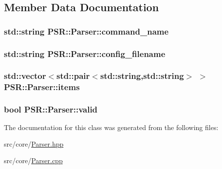 \subsection{\-Member \-Data \-Documentation}
\hypertarget{classPSR_1_1Parser_a1c3ab112c2c5c73d1df9f505b4bb4ecd}{
\subsubsection[{command\-\_\-name}]{\setlength{\rightskip}{0pt plus 5cm}std\-::string {\bf \-P\-S\-R\-::\-Parser\-::command\-\_\-name}}}\label{classPSR_1_1Parser_a1c3ab112c2c5c73d1df9f505b4bb4ecd}
\hypertarget{classPSR_1_1Parser_af6881b6cd3d70d39a3a751b5dcf794e1}{
\subsubsection[{config\-\_\-filename}]{\setlength{\rightskip}{0pt plus 5cm}std\-::string {\bf \-P\-S\-R\-::\-Parser\-::config\-\_\-filename}}}\label{classPSR_1_1Parser_af6881b6cd3d70d39a3a751b5dcf794e1}
\hypertarget{classPSR_1_1Parser_aef76f91df7efa2b90449de2a2fe2bd14}{
\subsubsection[{items}]{\setlength{\rightskip}{0pt plus 5cm}std\-::vector$<$std\-::pair$<$std\-::string,std\-::string$>$ $>$ {\bf \-P\-S\-R\-::\-Parser\-::items}}}\label{classPSR_1_1Parser_aef76f91df7efa2b90449de2a2fe2bd14}
\hypertarget{classPSR_1_1Parser_a2b9ecb5e358711e71000893a4246c9c3}{
\subsubsection[{valid}]{\setlength{\rightskip}{0pt plus 5cm}bool {\bf \-P\-S\-R\-::\-Parser\-::valid}}}\label{classPSR_1_1Parser_a2b9ecb5e358711e71000893a4246c9c3}


\-The documentation for this class was generated from the following files\-:\begin{DoxyCompactItemize}
\item 
src/core/\hyperlink{Parser_8hpp}{\-Parser.\-hpp}\item 
src/core/\hyperlink{Parser_8cpp}{\-Parser.\-cpp}\end{DoxyCompactItemize}
